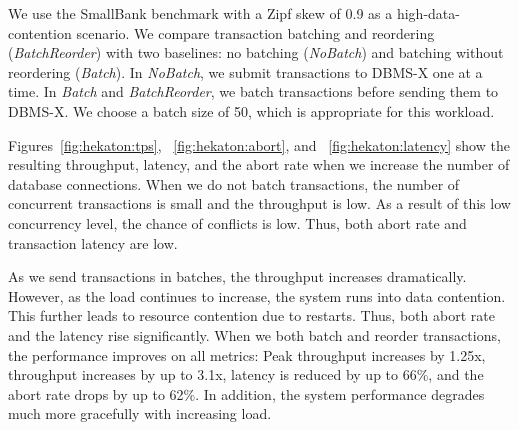 
We use the SmallBank benchmark with a Zipf skew of 0.9 as a high-data-contention scenario. We compare transaction batching and reordering (\emph{BatchReorder}) with two baselines: no batching (\emph{NoBatch}) and batching without reordering (\emph{Batch}). In \emph{NoBatch}, we submit transactions to DBMS-X one at a time. In \emph{Batch} and \emph{BatchReorder}, we batch transactions before sending them to DBMS-X. We choose a batch size of 50, which is appropriate for this workload.

Figures~\ref{fig:hekaton:tps}, ~\ref{fig:hekaton:abort}, and ~\ref{fig:hekaton:latency} show the resulting throughput, latency, and the abort rate when we increase the number of database connections.  When we do not batch transactions, the number of concurrent transactions is small and the throughput is low. As a result of this low concurrency level, the chance of conflicts is low. Thus, both abort rate and transaction latency are low. 

As we send transactions in batches, the throughput increases dramatically. 
However, as the load continues to increase, the system runs into data contention. This further leads to resource contention due to restarts. Thus, both abort rate and the latency rise significantly. When we both batch and reorder transactions, the performance improves on all metrics: Peak throughput increases by 1.25x, throughput increases by up to 3.1x, latency is reduced by up to 66\%, and the abort rate drops by up to 62\%. In addition, the system performance degrades much more gracefully with increasing load.
